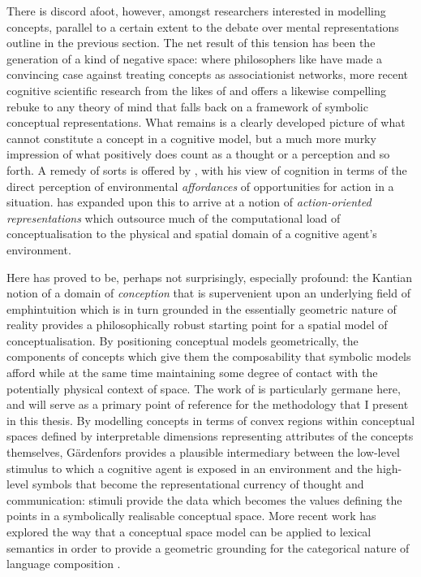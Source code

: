 There is discord afoot, however, amongst researchers interested in modelling concepts, parallel to a certain extent to the debate over mental representations outline in the previous section.  The net result of this tension has been the generation of a kind of negative space: where philosophers like \cite{FodorEA1988} have made a convincing case against treating concepts as associationist networks, more recent cognitive scientific research from the likes of \cite{Hutto2001} and \cite{Chemero2009} offers a likewise compelling rebuke to any theory of mind that falls back on a framework of symbolic conceptual representations.  What remains is a clearly developed picture of what cannot constitute a concept in a cognitive model, but a much more murky impression of what positively does count as a thought or a perception and so forth.  A remedy of sorts is offered by \cite{Gibson1979}, with his view of cognition in terms of the direct perception of environmental \emph{affordances} of opportunities for action in a situation.  \cite{Clark1997} has expanded upon this to arrive at a notion of \emph{action-oriented representations} which outsource much of the computational load of conceptualisation to the physical and spatial domain of a cognitive agent's environment.

Here \cite{Kant1787} has proved to be, perhaps not surprisingly, especially profound: the Kantian notion of a domain of \emph{conception} that is supervenient upon an underlying field of emph{intuition} which is in turn grounded in the essentially geometric nature of reality provides a philosophically robust starting point for a spatial model of conceptualisation.  By positioning conceptual models geometrically, the components of concepts which give them the composability that symbolic models afford while at the same time maintaining some degree of contact with the potentially physical context of space.  The work of \cite{Gardenfors2000} is particularly germane here, and will serve as a primary point of reference for the methodology that I present in this thesis.  By modelling concepts in terms of convex regions within conceptual spaces defined by interpretable dimensions representing attributes of the concepts themselves, G\"{a}rdenfors provides a plausible intermediary between the low-level stimulus to which a cognitive agent is exposed in an environment and the high-level symbols that become the representational currency of thought and communication: stimuli provide the data which becomes the values defining the points in a symbolically realisable conceptual space.  More recent work has explored the way that a conceptual space model can be applied to lexical semantics in order to provide a geometric grounding for the categorical nature of language composition \citep{Gardenfors2014}.

